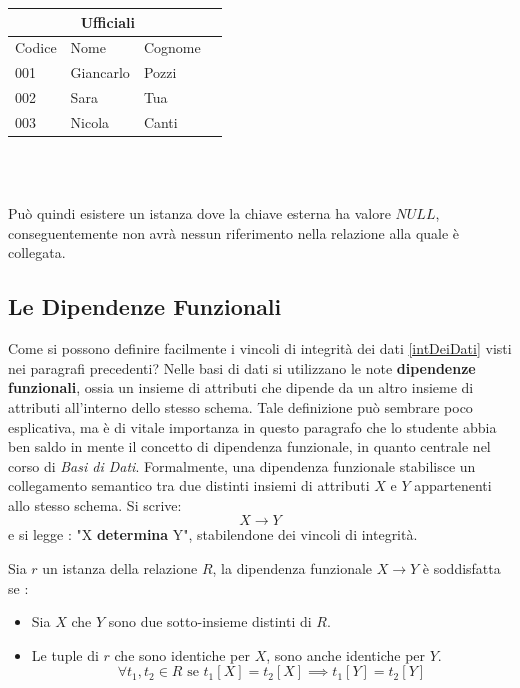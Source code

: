\documentclass[12pt, letterpaper]{article}
\begin{document}
\begin{tabular}{|l|l|l|r|}
    \hline
\multicolumn{3}{|c|}{\textbf{Ufficiali}}\\
    \hline
    Codice & Nome & Cognome \\
    \hline
    001 & Giancarlo & Pozzi \\
    \hline
    002 & Sara & Tua \\
    \hline
    003 & Nicola & Canti \\
    \hline
    \end{tabular}
\\ 
 \hphantom{.}\\
 \raggedright
Può quindi esistere un istanza dove la chiave esterna ha valore \(NULL\),
conseguentemente non avrà nessun riferimento nella relazione alla quale è collegata. 
\subsection{Le Dipendenze Funzionali}
Come si possono definire facilmente i vincoli di integrità dei dati \ref{intDeiDati} visti nei paragrafi 
precedenti? Nelle basi di dati si utilizzano le note \textbf{dipendenze funzionali}, ossia un insieme
di attributi che dipende da un altro insieme di attributi all'interno dello stesso schema. Tale definizione
può sembrare poco esplicativa, ma è di vitale importanza in questo paragrafo che lo studente abbia
ben saldo in mente il concetto di dipendenza funzionale, in quanto centrale nel corso di \textit{Basi di Dati}.
Formalmente, una dipendenza funzionale stabilisce un collegamento semantico tra due distinti insiemi 
di attributi \(X\) e \(Y\) appartenenti allo stesso schema. Si scrive:
\begin{equation}
    X\rightarrow Y
\end{equation}
e si legge : "X \textbf{determina} Y", stabilendone dei vincoli di integrità.
\begin{theorem}
    Sia \(r\) un istanza della relazione \(R\), la dipendenza funzionale \(X\rightarrow Y\) è soddisfatta se :
    \begin{itemize}
        \item Sia \(X\) che \(Y\) sono due sotto-insieme distinti di \(R\).
        \item Le tuple di \(r\) che sono identiche per \(X\), sono anche identiche per \(Y\). \begin{equation}
            \forall t_1,t_2 \in R \text{ se } t_1[X]=t_2[X] \implies t_1[Y]=t_2[Y]
        \end{equation}
    \end{itemize}
\end{theorem}
\end{document}
